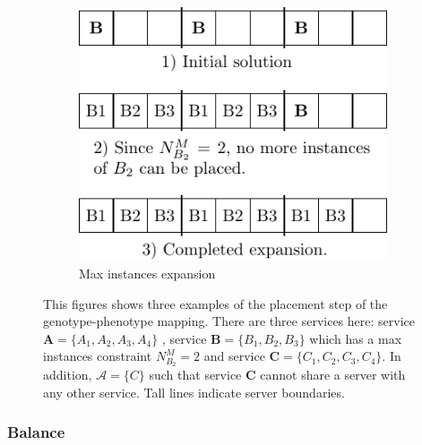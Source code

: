 \begin{figure}[t!]
	\begin{subfigure}[T]{.3\linewidth}
		\centering
		\includegraphics[width=\columnwidth]{figures/limited_expansion-crop}
		\caption{Max instances expansion}
		\label{fig:1c}
	\end{subfigure}
	\vspace{2em}
	\caption{This figures shows three examples of the placement step of the genotype-phenotype mapping. There are three services here: service $\mathbf{A} = \{ A_1, A_2, A_3, A_4\}$ , service $\mathbf{B} = \{B_1, B_2, B_3\}$ which has a max instances constraint $N_{B_2}^M = 2$ and service $\mathbf{C} = \{C_1, C_2, C_3, C_4\}$. In addition, $\mathcal{A} = \{C\}$ such that service $\mathbf{C}$ cannot share a server with any other service. Tall lines indicate server boundaries.}
	\label{fig:placement}
\end{figure}


\subsubsection{Balance}

